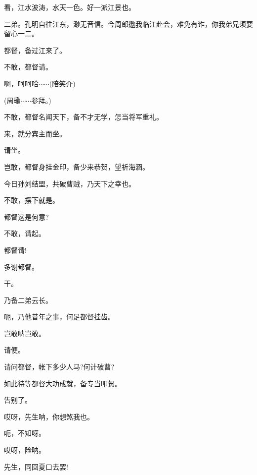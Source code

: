 {看，江水波涛，水天一色。好一派江景也。


二弟。孔明自往江东，渺无音信。今周郎邀我临江赴会，难免有诈，你我弟兄须要留心一二。

\vspace{5pt}

都督，备过江来了。

不敢，都督请。

啊，呵呵哈$\cdots{}\cdots{}$({\hwfs 陪笑介})

(周瑜\hspace{30pt}$\cdots{}\cdots{}$参拜。)

不敢，都督名闻天下，备不才无学，怎当将军重礼。

来，就分宾主而坐。

请坐。

岂敢，都督身挂金印，备少来恭贺，望祈海涵。

今日孙刘结盟，共破曹贼，乃天下之幸也。

不敢，摆下就是。

都督这是何意?

不敢，请起。

都督请!




多谢都督。

干。

乃备二弟云长。

呃，乃他昔年之事，何足都督挂齿。

岂敢呐岂敢。

请便。

请问都督，帐下多少人马?何计破曹?

如此待等都督大功成就，备专当叩贺。

告别了。


\vspace{5pt}


哎呀，先生呐，你想煞我也。

呃，不知呀。

哎呀，险呐。

先生，同回夏口去罢!


}
